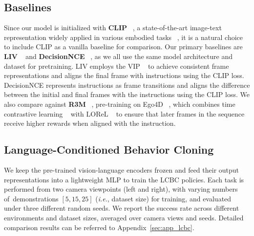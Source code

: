 \subsection{Baselines}
Since our model is initialized with \textbf{CLIP} ~\cite{icml21-clip}, a state-of-the-art image-text representation widely applied in various embodied tasks ~\cite{l4dc22-clipapp2,cvpr22-clipapp3,corl21-clipapp1,nips22-clipapp4}, it is a natural choice to include CLIP as a vanilla baseline for comparison. Our primary baselines are \textbf{LIV} ~\cite{icml23-liv} and \textbf{DecisionNCE} ~\cite{icml24-decisionnce}, as we all use the same model architecture and dataset for pretraining. LIV employs the VIP ~\cite{iclr23-vip} to achieve consistent frame representations and aligns the final frame with instructions using the CLIP loss. DecisionNCE represents instructions as frame transitions and aligns the difference between the initial and final frames with the instructions using the CLIP loss. We also compare against \textbf{R3M} ~\cite{corl22-r3m}, pre-training on Ego4D ~\cite{cvpr22-ego4d}, which combines time contrastive learning ~\cite{icra18-tcn} with LOReL ~\cite{corl21-lorel} to ensure that later frames in the sequence receive higher rewards when aligned with the instruction. 




\subsection{Language-Conditioned Behavior Cloning}
We keep the pre-trained vision-language encoders frozen and feed their output representations into a lightweight MLP to train the LCBC policies. Each task is performed from two camera viewpoints (left and right), with varying numbers of demonstrations $\left[5, 15, 25\right]$ (\textit{i.e.}, dataset size) for training, and evaluated under three different random seeds. We report the success rate across different environments and dataset sizes, averaged over camera views and seeds. Detailed comparison results can be referred to Appendix~\ref{sec:app_lcbc}.

